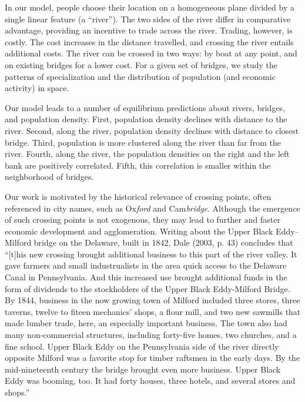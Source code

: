 \documentclass[12pt]{article}
\begin{document}
In our model, people choose their location on a homogeneous plane divided by
a single linear feature (a \textquotedblleft river\textquotedblright ). The
two sides of the river differ in comparative advantage, providing an
incentive to trade across the river. Trading, however, is costly. The cost
increases in the distance travelled, and crossing the river entails
additional costs. The river can be crossed in two ways: by boat at any
point, and on existing bridges for a lower cost. For a given set of bridges,
we study the patterns of specialization and the distribution of population
(and economic activity) in space.

Our model leads to a number of equilibrium predictions about rivers,
bridges, and population density. First, population density declines with
distance to the river. Second, along the river, population density declines
with distance to closest bridge. Third, population is more clustered along
the river than far from the river. Fourth, along the river, the population
densities on the right and the left bank are positively correlated. Fifth,
this correlation is smaller within the neighborhood of bridges.

Our work is motivated by the historical relevance of crossing points, often
referenced in city names, such as Ox\emph{ford} and Cam\emph{bridge}.
Although the emergence of such crossing points is not exogenous, they may
lead to further and faster economic development and agglomeration. Writing
about the Upper Black Eddy--Milford bridge on the Delaware, built in 1842,
Dale (2003, p. 43) concludes that ``[t]his new crossing brought additional
business to this part of the river valley. It gave farmers and small
industrualists in the area quick access to the Delaware Canal in
Pennsylvania. And this increased use brought additional funds in the form of
dividends to the stockholders of the Upper Black Eddy-Milford Bridge. By
1844, business in the now growing town of Milford included three stores,
three taverns, twelve to fiteen mechanics' shops, a flour mill, and two new
sawmills that made lumber trade, here, an especially important business. The
town also had many non-commercial structures, including forty-five homes,
two churches, and a fine school. Upper Black Eddy on the Pennsylvania side
of the river directly opposite Milford was a favorite stop for timber
raftsmen in the early days. By the mid-nineteenth century the bridge brought
even more business. Upper Black Eddy was booming, too. It had forty houses,
three hotels, and several stores and shops.''
\end{document}
